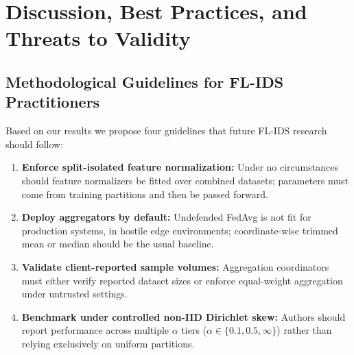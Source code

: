 \documentclass[runningheads]{llncs}
\begin{document}
\begin{table}[t]
\caption{Cross-Dataset Transfer Evaluation Accuracy}
\label{tab:cross_dataset}
\centering
{}
\end{table}

\section{Discussion, Best Practices, and Threats to Validity}
\label{sec:discussion}

\subsection{Methodological Guidelines for FL-IDS Practitioners}
Based on our results we propose four guidelines that future FL-IDS research should follow:
\begin{enumerate}
    \item \textbf{Enforce split-isolated feature normalization:} Under no circumstances should feature normalizers be fitted over combined datasets; parameters must come from training partitions and then be passed forward.
    \item \textbf{Deploy aggregators by default:} Undefended FedAvg is not fit for production systems, in hostile edge environments; coordinate-wise trimmed mean or median should be the usual baseline.
    \item \textbf{Validate client-reported sample volumes:} Aggregation coordinators must either verify reported dataset sizes or enforce equal-weight aggregation under untrusted settings.
    \item \textbf{Benchmark under controlled non-IID Dirichlet skew:} Authors should report performance across multiple $\alpha$ tiers ($\alpha \in \{0.1, 0.5, \infty\}$) rather than relying exclusively on uniform partitions.
\end{enumerate}
\end{document}
